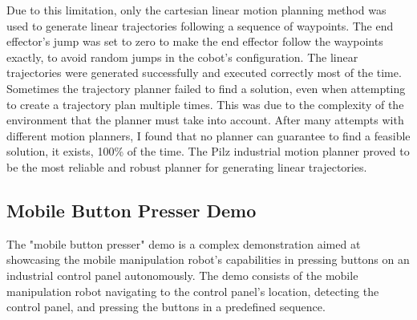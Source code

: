 Due to this limitation, only the cartesian linear motion planning method was used to generate linear trajectories
following a sequence of waypoints. The end effector's jump was set to zero to make the end effector follow
the waypoints exactly, to avoid random jumps in the cobot's configuration. The linear trajectories were
generated successfully and executed correctly most of the time. Sometimes the trajectory planner failed
to find a solution, even when attempting to create a trajectory plan multiple times. This was due to the
complexity of the environment that the planner must take into account. After many attempts with 
different motion planners, I found that no planner can guarantee to find a feasible solution,
it exists, 100\% of the time. The Pilz industrial motion planner proved to be the most reliable and
robust planner for generating linear trajectories.


\subsection{Mobile Button Presser Demo}

The "mobile button presser" demo is a complex demonstration aimed at showcasing the mobile manipulation robot's
capabilities in pressing buttons on an industrial control panel autonomously. The demo consists of the mobile
manipulation robot navigating to the control panel's location, detecting the control panel, and pressing the buttons
in a predefined sequence.

